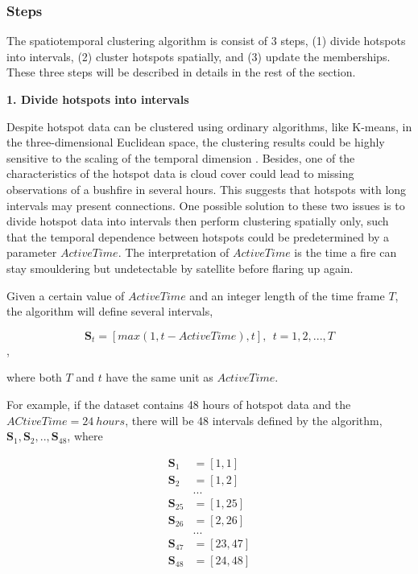 \hypertarget{steps}{%
\subsubsection{Steps}\label{steps}}

The spatiotemporal clustering algorithm is consist of 3 steps, (1)
divide hotspots into intervals, (2) cluster hotspots spatially, and (3)
update the memberships. These three steps will be described in details
in the rest of the section.

\textbf{1. Divide hotspots into intervals}

Despite hotspot data can be clustered using ordinary algorithms, like
K-means, in the three-dimensional Euclidean space, the clustering
results could be highly sensitive to the scaling of the temporal
dimension \citep{kisilevich2009spatio}. Besides, one of the
characteristics of the hotspot data is cloud cover could lead to missing
observations of a bushfire in several hours. This suggests that hotspots
with long intervals may present connections. One possible solution to
these two issues is to divide hotspot data into intervals then perform
clustering spatially only, such that the temporal dependence between
hotspots could be predetermined by a parameter \(ActiveTime\). The
interpretation of \(ActiveTime\) is the time a fire can stay smouldering
but undetectable by satellite before flaring up again.

Given a certain value of \(ActiveTime\) and an integer length of the
time frame \(T\), the algorithm will define several intervals,

\[\boldsymbol{S}_t = [max(1,t-ActiveTime),t],~~t = 1,2,...,T\],

where both \(T\) and \(t\) have the same unit as \(ActiveTime\).

For example, if the dataset contains 48 hours of hotspot data and the
\(ACtiveTime = 24~hours\), there will be 48 intervals defined by the
algorithm, \(\boldsymbol{S}_1,\boldsymbol{S}_2,..,\boldsymbol{S}_{48}\),
where

\begin{align*}
\boldsymbol{S}_1 &= [1,1]\\
\boldsymbol{S}_2 &= [1,2]\\
&...\\
\boldsymbol{S}_{25} &= [1,25]\\
\boldsymbol{S}_{26} &= [2,26]\\
&...\\
\boldsymbol{S}_{47} &= [23,47]\\
\boldsymbol{S}_{48} &= [24,48]
\end{align*}

